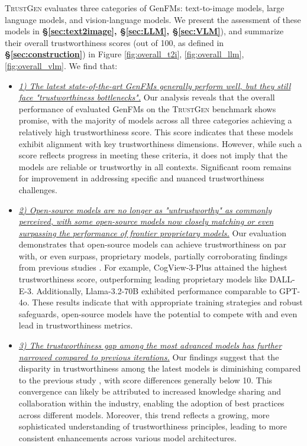 \textsc{TrustGen} evaluates three categories of GenFMs: text-to-image models, large language models, and vision-language models. We present the assessment of these models in \textbf{\S\ref{sec:text2image}, \S\ref{sec:LLM}, \S\ref{sec:VLM}}), and summarize their overall trustworthiness scores (out of 100, as defined in \textbf{\S\ref{sec:construction}}) in Figure \ref{fig:overall_t2i}, \ref{fig:overall_llm}, \ref{fig:overall_vlm}. We find that:
\begin{itemize}[nolistsep, leftmargin=*]
\item \textit{\ul{1) The latest state-of-the-art GenFMs generally perform well, but they still face "trustworthiness bottlenecks".}} Our analysis reveals that the overall performance of evaluated GenFMs on the \textsc{TrustGen} benchmark shows promise, with the majority of models across all three categories achieving a relatively high trustworthiness score. This score indicates that these models exhibit alignment with key trustworthiness dimensions. However, while such a score reflects progress in meeting these criteria, it does not imply that the models are reliable or trustworthy in all contexts. Significant room remains for improvement in addressing specific and nuanced trustworthiness challenges. 
\item \textit{\ul{2) Open-source models are no longer as "untrustworthy" as commonly perceived, with some open-source models now closely matching or even surpassing the performance of frontier proprietary models.}} Our evaluation demonstrates that open-source models can achieve trustworthiness on par with, or even surpass, proprietary models, partially corroborating findings from previous studies \cite{huang2024position}. For example, CogView-3-Plus attained the highest trustworthiness score, outperforming leading proprietary models like DALL-E-3. Additionally, Llama-3.2-70B exhibited performance comparable to GPT-4o. These results indicate that with appropriate training strategies and robust safeguards, open-source models have the potential to compete with and even lead in trustworthiness metrics.\vspace{+0.05in}
\item \textit{\ul{3) The trustworthiness gap among the most advanced models has further narrowed compared to previous iterations.}} Our findings suggest that the disparity in trustworthiness among the latest models is diminishing compared to the previous study \cite{huang2024position}, with score differences generally below 10. This convergence can likely be attributed to increased knowledge sharing and collaboration within the industry, enabling the adoption of best practices across different models. Moreover, this trend reflects a growing, more sophisticated understanding of trustworthiness principles, leading to more consistent enhancements across various model architectures. \vspace{+0.05in}

\end{itemize}
